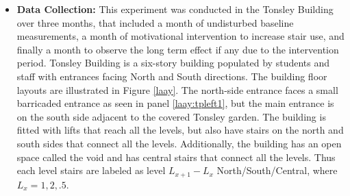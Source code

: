 \documentclass[../UNBThesis2.tex]{subfiles}
\begin{document}
\begin{itemize}

 \item\textbf{Data Collection: }
This experiment was conducted in the Tonsley Building over three months, that included a month of undisturbed baseline measurements, a month of motivational intervention to increase stair use, and finally a month to observe the long term effect if any due to the intervention period. Tonsley Building is a six-story building populated by students and staff with entrances facing North and South directions. The building floor layouts are illustrated in Figure \ref{laay}. The north-side entrance faces a small barricaded entrance as seen in panel \ref{laay:tpleft1}, but the main entrance is on the south side adjacent to the covered Tonsley garden. The building is fitted with lifts that reach all the levels, but also have stairs on the north and south sides that connect all the levels. Additionally, the building has an open space called the void and has central stairs that connect all the levels. Thus each level stairs are labeled as level $L_{x+1}-L_x$ North/South/Central, where $L_x = 1,2,.5$. 



\end{itemize}
\end{document}
